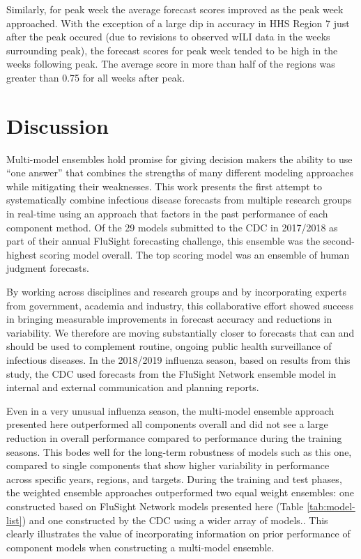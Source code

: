 \documentclass{article}\usepackage[]{graphicx}\usepackage[]{color}
\begin{document}
Similarly, for peak week the average forecast scores improved as the peak week approached. With the exception of a large dip in accuracy in HHS Region 7 just after the peak occured (due to revisions to observed wILI data in the weeks surrounding peak), the forecast scores for peak week tended to be high in the weeks following peak. The average score in more than half of the regions was greater than 0.75 for all weeks after peak. 


\section{Discussion}

Multi-model ensembles hold promise for giving decision makers the ability to use ``one answer'' that combines the strengths of many different modeling approaches while mitigating their weaknesses. 
This work presents the first attempt to systematically combine infectious disease forecasts from multiple research groups in real-time using an approach that factors in the past performance of each component method.
Of the 29 models submitted to the CDC in 2017/2018 as part of their annual FluSight forecasting challenge, this ensemble was the second-highest scoring model overall. 
The top scoring model was an ensemble of human judgment forecasts.\cite{farrow2017human}

By working across disciplines and research groups and by incorporating experts from government, academia and industry, this collaborative effort showed success in bringing measurable improvements in forecast accuracy and reductions in variability.
We therefore are moving substantially closer to forecasts that can and should be used to complement routine, ongoing public health surveillance of infectious diseases.
In the 2018/2019 influenza season, based on results from this study, the CDC used forecasts from the FluSight Network ensemble model in internal and external communication and planning reports.

Even in a very unusual influenza season, the multi-model ensemble approach presented here outperformed all components overall and did not see a large reduction in overall performance compared to performance during the training seasons. 
This bodes well for the long-term robustness of models such as this one, compared to single components that show higher variability in performance across specific years, regions, and targets. 
During the training and test phases, the weighted ensemble approaches outperformed two equal weight ensembles: one constructed based on FluSight Network models presented here (Table \ref{tab:model-list}) and one constructed by the CDC using a wider array of models.\cite{McGowan2018}. 
This clearly illustrates the value of incorporating information on prior performance of component models when constructing a multi-model ensemble.
\end{document}
